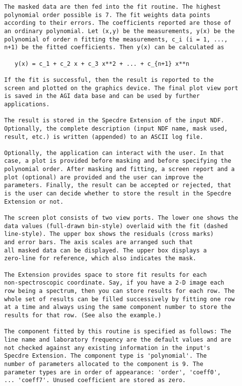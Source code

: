 \begin{description}
\begin{verbatim}
   The masked data are then fed into the fit routine. The highest
   polynomial order possible is 7. The fit weights data points
   according to their errors. The coefficients reported are those of
   an ordinary polynomial. Let (x,y) be the measurements, y(x) be the
   polynomial of order n fitting the measurements, c_i (i = 1, ...,
   n+1) be the fitted coefficients. Then y(x) can be calculated as

      y(x) = c_1 + c_2 x + c_3 x**2 + ... + c_{n+1} x**n

   If the fit is successful, then the result is reported to the
   screen and plotted on the graphics device. The final plot view port
   is saved in the AGI data base and can be used by further
   applications.

   The result is stored in the Specdre Extension of the input NDF.
   Optionally, the complete description (input NDF name, mask used,
   result, etc.) is written (appended) to an ASCII log file.

   Optionally, the application can interact with the user. In that
   case, a plot is provided before masking and before specifying the
   polynomial order. After masking and fitting, a screen report and a
   plot (optional) are provided and the user can improve the
   parameters. Finally, the result can be accepted or rejected, that
   is the user can decide whether to store the result in the Specdre
   Extension or not.

   The screen plot consists of two view ports. The lower one shows the
   data values (full-drawn bin-style) overlaid with the fit (dashed
   line-style). The upper box shows the residuals (cross marks)
   and error bars. The axis scales are arranged such that
   all masked data can be displayed. The upper box displays a
   zero-line for reference, which also indicates the mask.

   The Extension provides space to store fit results for each
   non-spectroscopic coordinate. Say, if you have a 2-D image each
   row being a spectrum, then you can store results for each row. The
   whole set of results can be filled successively by fitting one row
   at a time and always using the same component number to store the
   results for that row. (See also the example.)

   The component fitted by this routine is specified as follows: The
   line name and laboratory frequency are the default values and are
   not checked against any existing information in the input's
   Specdre Extension. The component type is 'polynomial'. The
   number of parameters allocated to the component is 9. The
   parameter types are in order of appearance: 'order', 'coeff0',
   ... 'coeff7'. Unused coefficient are stored as zero.


\end{verbatim}
\end{description}
